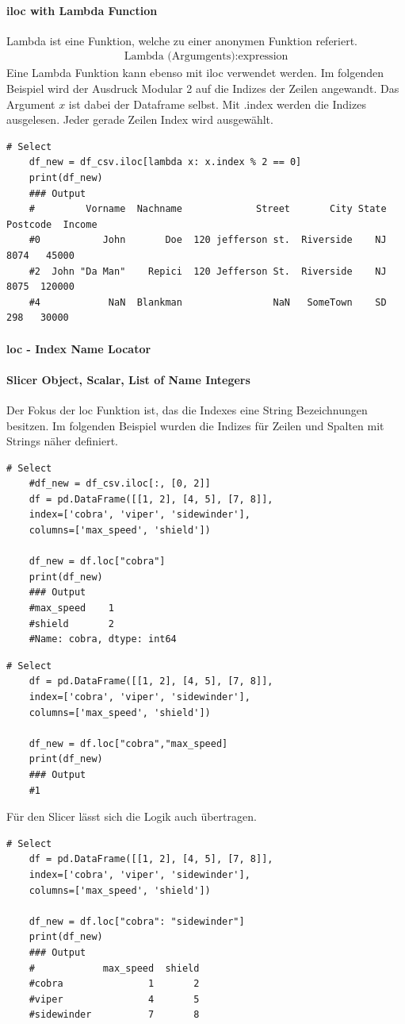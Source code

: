 \paragraph*{iloc with Lambda Function}
Lambda ist eine Funktion, welche zu einer anonymen Funktion referiert.
\begin{align}
	\text{Lambda (Argumgents)}:\text{expression}
\end{align}
Eine Lambda Funktion kann ebenso mit iloc verwendet werden. Im folgenden Beispiel wird der Ausdruck Modular 2 auf die Indizes der Zeilen angewandt. Das Argument $x$ ist dabei der Dataframe selbst. Mit .index werden die Indizes ausgelesen. Jeder gerade Zeilen Index wird ausgewählt.
\begin{lstlisting}[style=python]
	# Select 
	df_new = df_csv.iloc[lambda x: x.index % 2 == 0]
	print(df_new)
	### Output
	#         Vorname  Nachname             Street       City State  Postcode  Income
	#0           John       Doe  120 jefferson st.  Riverside    NJ      8074   45000
	#2  John "Da Man"    Repici  120 Jefferson St.  Riverside    NJ      8075  120000
	#4            NaN  Blankman                NaN   SomeTown    SD       298   30000
\end{lstlisting}

\paragraph{loc - Index Name Locator}
\paragraph*{Slicer Object, Scalar, List of Name Integers}
Der Fokus der loc Funktion ist, das die Indexes eine String Bezeichnungen besitzen. Im folgenden Beispiel wurden die Indizes für Zeilen und Spalten mit Strings näher definiert.
\begin{lstlisting}[style=python]
	# Select 
	#df_new = df_csv.iloc[:, [0, 2]]
	df = pd.DataFrame([[1, 2], [4, 5], [7, 8]],
	index=['cobra', 'viper', 'sidewinder'],
	columns=['max_speed', 'shield'])
	
	df_new = df.loc["cobra"]
	print(df_new)
	### Output
	#max_speed    1
	#shield       2
	#Name: cobra, dtype: int64
\end{lstlisting}
\begin{lstlisting}[style=python]
	# Select 
	df = pd.DataFrame([[1, 2], [4, 5], [7, 8]],
	index=['cobra', 'viper', 'sidewinder'],
	columns=['max_speed', 'shield'])
	
	df_new = df.loc["cobra","max_speed]
	print(df_new)
	### Output
	#1
\end{lstlisting}
Für den Slicer lässt sich die Logik auch übertragen.
\begin{lstlisting}[style=python]
	# Select 
	df = pd.DataFrame([[1, 2], [4, 5], [7, 8]],
	index=['cobra', 'viper', 'sidewinder'],
	columns=['max_speed', 'shield'])
	
	df_new = df.loc["cobra": "sidewinder"]
	print(df_new)
	### Output
	#            max_speed  shield
	#cobra               1       2
	#viper               4       5
	#sidewinder          7       8
\end{lstlisting}

